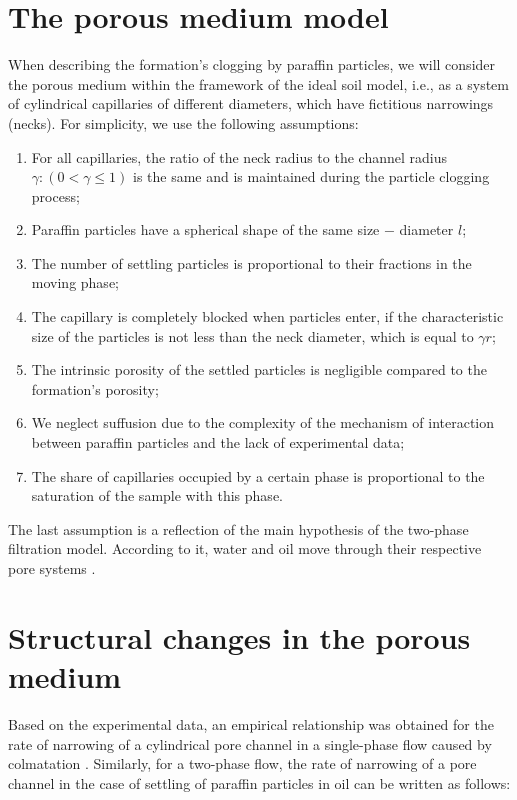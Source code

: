 \documentclass[
11pt,%
tightenlines,%
twoside,%
onecolumn,%
nofloats,%
nobibnotes,%
nofootinbib,%
superscriptaddress,%
noshowpacs,%
centertags]%
{revtex4-2}
\begin{document}
\section{The porous medium model}
	When describing the formation's clogging by paraffin particles, we will consider the porous medium within the framework of the ideal soil model, i.e., as a system of cylindrical capillaries of different diameters, which have fictitious narrowings (necks). For simplicity, we use the following assumptions:
	
\begin{enumerate} 
\item For all capillaries, the ratio of the neck radius to the channel radius $\gamma :(0< \gamma \leq 1)$ is the same and is maintained during the particle clogging process;
\item Paraffin particles have a spherical shape of the same size $-$ diameter $l$;
\item The number of settling particles is proportional to their fractions in the moving phase;
\item The capillary is completely blocked when particles enter, if the characteristic size of the particles is not less than the neck diameter, which is equal to $\gamma r$;
\item The intrinsic porosity of the settled particles is negligible compared to the formation's porosity;
\item We neglect suffusion due to the complexity of the mechanism of interaction between paraffin particles and the lack of experimental data;
\item The share of capillaries occupied by a certain phase is proportional to the saturation of the sample with this phase.
\end{enumerate}
The last assumption is a reflection of the main hypothesis of the two-phase filtration model. According to it, water and oil move through their respective pore systems \cite{14}.


\section{Structural changes in the porous medium}
	Based on the experimental data, an empirical relationship was obtained for the rate of narrowing of a cylindrical pore channel in a single-phase flow caused by colmatation \cite{8}. Similarly, for a two-phase flow, the rate of narrowing of a pore channel in the case of settling of paraffin particles in oil can be written as follows:
\end{document}
